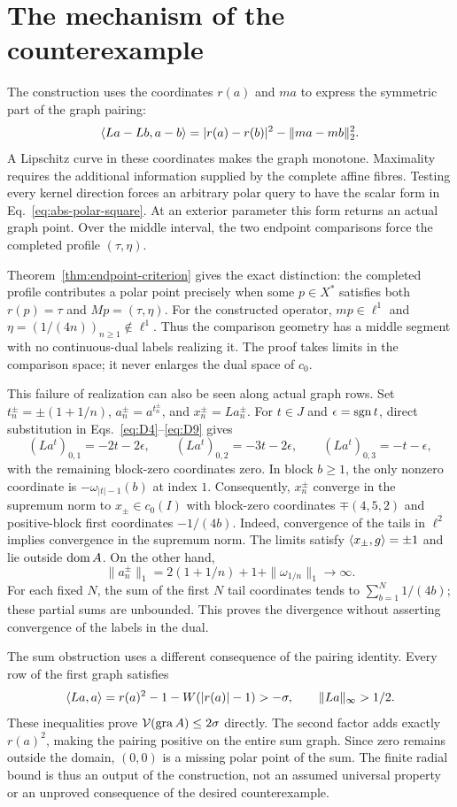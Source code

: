 \section{The mechanism of the counterexample}
\label{sec:structure}
The construction uses the coordinates $r(a)$ and $ma$ to express the
symmetric part of the graph pairing:
\[
\langle La-Lb,a-b\rangle=|r(a)-r(b)|^2-\|ma-mb\|_2^2.
\]
A Lipschitz curve in these coordinates makes the graph monotone.
Maximality requires the additional information supplied by the complete
affine fibres. Testing every kernel direction forces an arbitrary polar
query to have the scalar form in Eq.~\eqref{eq:abs-polar-square}.
At an exterior parameter this form returns an actual graph point.
Over the middle interval, the two endpoint comparisons force the
completed profile $(\tau,\eta)$.

Theorem~\ref{thm:endpoint-criterion} gives the exact distinction:
the completed profile contributes a polar point precisely when
some $p\in X^*$ satisfies both $r(p)=\tau$ and $Mp=(\tau,\eta)$.
For the constructed operator, $mp\in\ell^1$ and
$\eta=(1/(4n))_{n\ge1}\notin\ell^1$. Thus the comparison geometry
has a middle segment with no continuous-dual labels realizing it.
The proof takes limits in the comparison space; it never enlarges
the dual space of $c_0$.

This failure of realization can also be seen along actual graph rows.
Set $t_n^\pm=\pm(1+1/n)$, $a_n^\pm=a^{t_n^\pm}$, and
$x_n^\pm=La_n^\pm$. For $t\in J$ and $\epsilon=\operatorname{sgn} t$,
direct substitution in Eqs.~\eqref{eq:D4}--\eqref{eq:D9} gives
\[
(La^t)_{0,1}=-2t-2\epsilon,\qquad
(La^t)_{0,2}=-3t-2\epsilon,\qquad
(La^t)_{0,3}=-t-\epsilon,
\]
with the remaining block-zero coordinates zero. In block $b\ge1$,
the only nonzero coordinate is $-\omega_{|t|-1}(b)$ at index $1$.
Consequently, $x_n^\pm$ converge in the supremum norm to
$x_\pm\in c_0(I)$ with block-zero coordinates $\mp(4,5,2)$ and
positive-block first coordinates $-1/(4b)$. Indeed, convergence of
the tails in $\ell^2$ implies convergence in the supremum norm.
The limits satisfy $\langle x_\pm,g\rangle=\pm1$ and lie outside $\operatorname{dom} A$.
On the other hand,
\[
\|a_n^\pm\|_1=2(1+1/n)+1+\|\omega_{1/n}\|_1\longrightarrow\infty.
\]
For each fixed $N$, the sum of the first $N$ tail coordinates tends to
$\sum_{b=1}^N1/(4b)$; these partial sums are unbounded. This proves
the divergence without asserting convergence of the labels in the dual.

The sum obstruction uses a different consequence of the pairing identity.
Every row of the first graph satisfies
\[
\langle La,a\rangle=r(a)^2-1-W(|r(a)|-1)>-\sigma,\qquad
\|La\|_\infty>1/2.
\]
These inequalities prove $\mathcal V(\operatorname{gra} A)\le2\sigma$ directly.
The second factor adds exactly $r(a)^2$, making the pairing positive
on the entire sum graph. Since zero remains outside the domain,
$(0,0)$ is a missing polar point of the sum. The finite radial bound
is thus an output of the construction, not an assumed universal
property or an unproved consequence of the desired counterexample.
